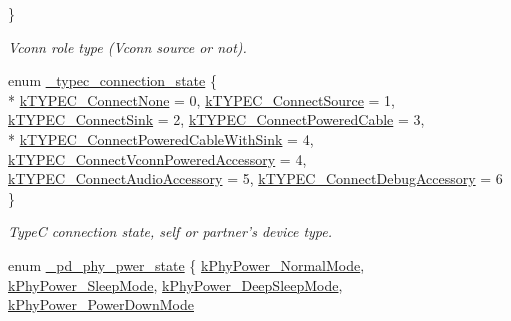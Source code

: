 \begin{DoxyCompactItemize}
 \}
\begin{DoxyCompactList}\small\item\em Vconn role type (Vconn source or not). \end{DoxyCompactList}\item 
enum \hyperlink{group__usb__pd__stack_ga5dcf4d70a373001cfde169f0e8b9a1ba}{\-\_\-typec\-\_\-connection\-\_\-state} \{ \\*
\hyperlink{group__usb__pd__stack_gga5dcf4d70a373001cfde169f0e8b9a1baa1b6d208fb63489f6e80b3dc799aa9c86}{k\-T\-Y\-P\-E\-C\-\_\-\-Connect\-None} = 0, 
\hyperlink{group__usb__pd__stack_gga5dcf4d70a373001cfde169f0e8b9a1baa18eca9dd0eea417e318901214fabeab2}{k\-T\-Y\-P\-E\-C\-\_\-\-Connect\-Source} = 1, 
\hyperlink{group__usb__pd__stack_gga5dcf4d70a373001cfde169f0e8b9a1baae6a08556f4bb1b80036fb9337d17174c}{k\-T\-Y\-P\-E\-C\-\_\-\-Connect\-Sink} = 2, 
\hyperlink{group__usb__pd__stack_gga5dcf4d70a373001cfde169f0e8b9a1baa176b6047417cd678a54c51197e178247}{k\-T\-Y\-P\-E\-C\-\_\-\-Connect\-Powered\-Cable} = 3, 
\\*
\hyperlink{group__usb__pd__stack_gga5dcf4d70a373001cfde169f0e8b9a1baa778111413f201ebe3e54208b7ada83da}{k\-T\-Y\-P\-E\-C\-\_\-\-Connect\-Powered\-Cable\-With\-Sink} = 4, 
\hyperlink{group__usb__pd__stack_gga5dcf4d70a373001cfde169f0e8b9a1baabe52f1d315591ba1128796fe989888b6}{k\-T\-Y\-P\-E\-C\-\_\-\-Connect\-Vconn\-Powered\-Accessory} = 4, 
\hyperlink{group__usb__pd__stack_gga5dcf4d70a373001cfde169f0e8b9a1baaec27082d89b892747d115c26290da78f}{k\-T\-Y\-P\-E\-C\-\_\-\-Connect\-Audio\-Accessory} = 5, 
\hyperlink{group__usb__pd__stack_gga5dcf4d70a373001cfde169f0e8b9a1baa2bfe3fb0aa9780231c7c87e8803bd591}{k\-T\-Y\-P\-E\-C\-\_\-\-Connect\-Debug\-Accessory} = 6
 \}
\begin{DoxyCompactList}\small\item\em Type\-C connection state, self or partner's device type. \end{DoxyCompactList}\item 
enum \hyperlink{group__usb__pd__stack_ga71b74b2e350f1841b93c1f894403f85b}{\-\_\-pd\-\_\-phy\-\_\-pwer\-\_\-state} \{ \hyperlink{group__usb__pd__stack_gga71b74b2e350f1841b93c1f894403f85ba0f9bf42a2302492c1b73555ad91b530a}{k\-Phy\-Power\-\_\-\-Normal\-Mode}, 
\hyperlink{group__usb__pd__stack_gga71b74b2e350f1841b93c1f894403f85badb1ed3e38bf37093dfb3f76cf19c1cd9}{k\-Phy\-Power\-\_\-\-Sleep\-Mode}, 
\hyperlink{group__usb__pd__stack_gga71b74b2e350f1841b93c1f894403f85ba90004a9e65d289c449d971e0ee1e86bd}{k\-Phy\-Power\-\_\-\-Deep\-Sleep\-Mode}, 
\hyperlink{group__usb__pd__stack_gga71b74b2e350f1841b93c1f894403f85bad181bb6bd181d51b1e4ca8e64663ccec}{k\-Phy\-Power\-\_\-\-Power\-Down\-Mode}

\end{DoxyCompactItemize}
